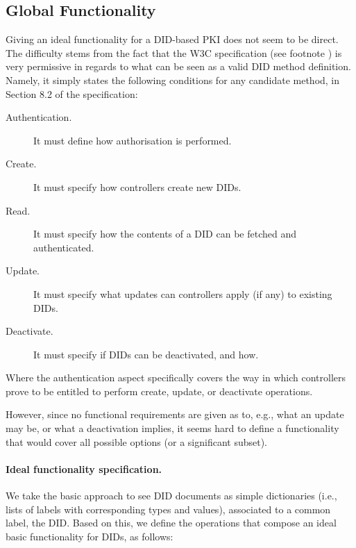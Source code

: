 \subsection{Global Functionality \IdealGPKIDID}

Giving an ideal functionality for a DID-based PKI does not seem to be direct.
The difficulty stems from the fact that the W3C specification (see footnote
) is very permissive in regards to what can be seen as a valid DID
method definition. Namely, it simply states the following conditions for any
candidate method, in Section 8.2 of the specification:

\begin{description}
\item[Authentication.] It must define how authorisation is performed.  
\item[Create.] It must specify how controllers create new DIDs.
\item[Read.] It must specify how the contents of a DID can be fetched and
  authenticated.
\item[Update.] It must specify what updates can controllers apply (if any)
  to existing DIDs.
\item[Deactivate.] It must specify if DIDs can be deactivated, and how.
\end{description}

Where the authentication aspect specifically covers the way in which controllers
prove to be entitled to perform create, update, or deactivate operations.

However, since no functional requirements are given as to, e.g., what an update
may be, or what a deactivation implies, it seems hard to define a functionality
that would cover all possible options (or a significant subset).

\paragraph{Ideal functionality specification.} %
We take the basic approach to see DID documents as simple dictionaries
(i.e., lists of labels with corresponding types and values), associated to a
common label, the DID. Based on this, we define the operations that compose an
ideal basic functionality for DIDs, as follows:

